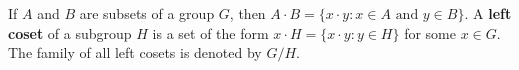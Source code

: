If $A$ and $B$ are subsets of a group $G$, then $A \cdot B = \{x \cdot y : x \in A \text{ and } y \in B\}$. A \textbf{left coset} of a subgroup $H$ is a set of the form $x \cdot H = \{x \cdot y : y \in H\}$ for some $x \in G$. The family of all left cosets is denoted by $G/H$.
